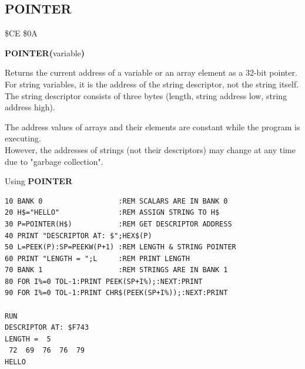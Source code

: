 
\newpage
\subsection{POINTER}
\begin{description}[leftmargin=2cm,style=nextline]
\item [Token:] \$CE \$0A
\item [Format:] {\bf POINTER(}variable{\bf)}
\item [Usage:]  Returns the current address of a variable
                or an array element as a 32-bit pointer.
                For string variables, it is the address of
                the string descriptor, not the string itself.
                The string descriptor consists of three bytes
                (length, string address low, string address high).

\item [Remarks:] The address values of arrays and their elements
                 are constant while the program is executing. \\
                 However, the addresses of strings (not their descriptors)
                 may change at any time due to
                 "garbage collection".

\item [Example:] Using {\bf POINTER}

\begin{tcolorbox}[colback=black,coltext=white]
\verbatimfont{\codefont}
\begin{verbatim}
10 BANK 0                  :REM SCALARS ARE IN BANK 0
20 H$="HELLO"              :REM ASSIGN STRING TO H$
30 P=POINTER(H$)           :REM GET DESCRIPTOR ADDRESS
40 PRINT "DESCRIPTOR AT: $";HEX$(P)
50 L=PEEK(P):SP=PEEKW(P+1) :REM LENGTH & STRING POINTER
60 PRINT "LENGTH = ";L     :REM PRINT LENGTH
70 BANK 1                  :REM STRINGS ARE IN BANK 1
80 FOR I%=0 TOL-1:PRINT PEEK(SP+I%);:NEXT:PRINT
90 FOR I%=0 TOL-1:PRINT CHR$(PEEK(SP+I%));:NEXT:PRINT

RUN
DESCRIPTOR AT: $F743
LENGTH =  5
 72  69  76  76  79
HELLO
\end{verbatim}
\end{tcolorbox}
\end{description}


\newpage
